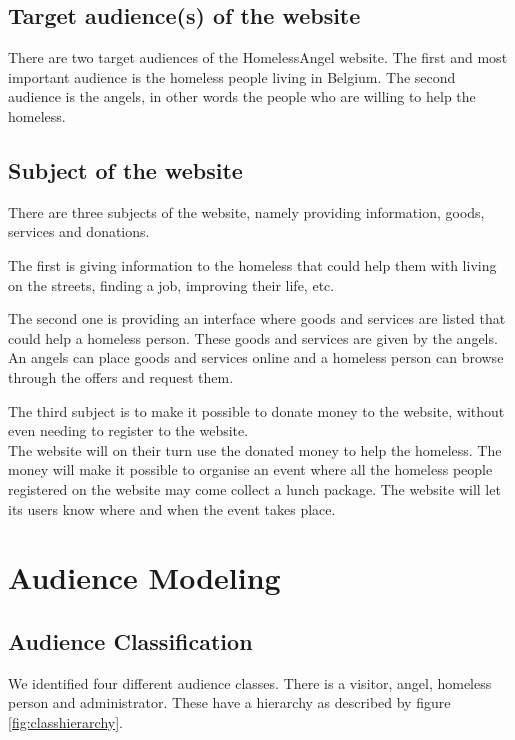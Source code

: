 \documentclass[a4paper]{report}
\begin{document}
\section{Target audience(s) of the website}
There are two target audiences of the HomelessAngel website. The first and most important audience is the homeless people living in Belgium. The second audience is the angels, in other words the people who are willing to help the homeless. 

\section{Subject of the website}
There are three subjects of the website, namely providing information, goods, services and donations. 

The first is giving information to the homeless that could help them with living on the streets, finding a job, improving their life, etc. 

The second one is providing an interface where goods and services are listed that could help a homeless person. These goods and services are given by the angels. An angels can place goods and services online and a homeless person can browse through the offers and request them. 

The third subject is to make it possible to donate money to the website, without even needing to register to the website. 
\\
The website will on their turn use the donated money to help the homeless. The money will make it possible to organise an event where all the homeless people registered on the website may come collect a lunch package. The website will let its users know where and when the event takes place.











\chapter{Audience Modeling}
\section{Audience Classification}
We identified four different audience classes. There is a visitor, angel, homeless person and administrator. These have a hierarchy as described by figure \ref{fig:classhierarchy}. 
\end{document}
